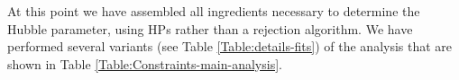 At this point we have assembled all ingredients necessary to determine the Hubble parameter, using HPs rather than a rejection algorithm. We have performed several variants (see Table \ref{Table:details-fits}) of the analysis that are shown in Table \ref{Table:Constraints-main-analysis}.

